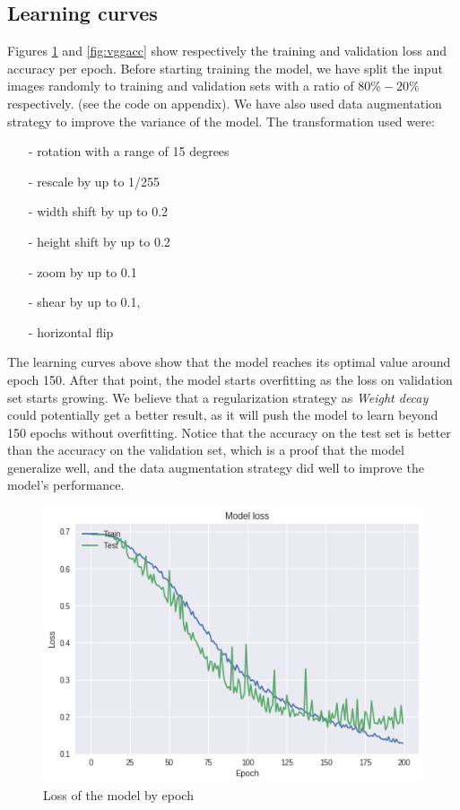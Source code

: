 \documentclass[a4paper]{article}
\begin{document}
\subsection{Learning curves}
Figures \ref{fig:vggloss} and \ref{fig:vggacc} show respectively the training and validation loss and accuracy per epoch.
%
%
Before starting training the model, we have split the input images randomly to training and validation sets with a ratio of $80\%-20\%$ respectively. (see the code on appendix).
%
We have also used data augmentation strategy to improve the variance of the model. The transformation used were:
\begin{itemize}
\setlength\itemsep{0em}
\item[-]rotation with a range of 15 degrees
\item[-]rescale by up to 1/255
\item[-]width shift by up to 0.2
\item[-]height shift by up to 0.2
\item[-]zoom by up to 0.1
\item[-]shear by up to 0.1,
\item[-]horizontal flip

\end{itemize}
%
The learning curves above show that the model reaches its optimal value around epoch 150. After that point, the model starts overfitting as the loss on validation set starts growing.
%
We believe that a regularization strategy as \textit{Weight decay} could potentially get a better result, as it will push the model to learn beyond 150 epochs without overfitting.
%
Notice that the accuracy on the test set is better than the accuracy on the validation set, which is a proof that the model generalize well, and the data augmentation strategy did well to improve the model's performance.
\begin{figure}[h!]
	\centering
	\includegraphics[scale=.6]{VGGLoss_of.png}
	\caption{Loss of the model by epoch}
	\label{fig:vggloss}
\end{figure}
\end{document}
